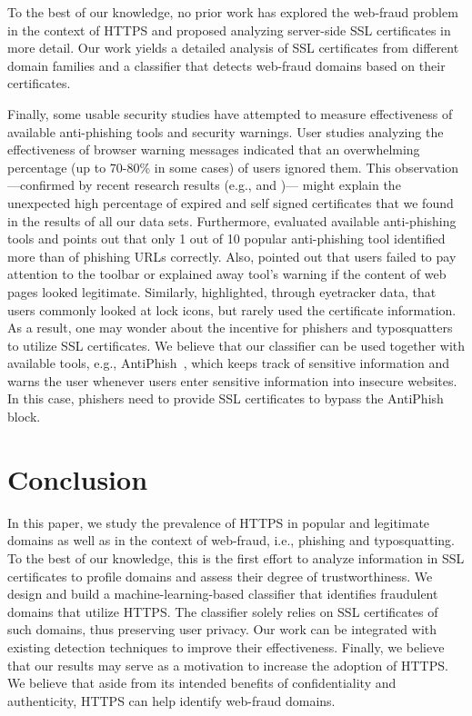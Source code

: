 \documentclass[twocolumn]{article}
\begin{document}
To the best of our knowledge, no prior work has explored the web-fraud problem 
in the context of HTTPS and proposed analyzing server-side SSL certificates in more detail.
Our work yields a detailed analysis of SSL certificates from different domain families and a 
classifier that detects web-fraud domains based on their certificates.

Finally, some usable security studies have attempted to measure effectiveness of available anti-phishing tools and security warnings.
User studies analyzing the effectiveness of browser warning messages indicated that an
overwhelming percentage (up to 70-80\% in some cases) of users ignored them. This
observation---confirmed by recent research results (e.g., \cite{ssl-usability}
and \cite{been-warned-ssl})--- might explain the unexpected high percentage of expired and
self signed certificates that we found in the results  of all our data sets.
Furthermore, \cite{zhang2007phinding} evaluated available anti-phishing tools and points out
that only 1 out of 10 popular anti-phishing tool identified more than  of phishing URLs correctly.
Also, \cite{wu2006security} pointed out that users failed to pay attention to the toolbar or explained away
tool's warning if the content of web pages looked legitimate.
Similarly, \cite{whalen2005gathering} highlighted, through eyetracker data, that users commonly
looked at lock icons, but rarely used the certificate information. As a result, one may wonder about the incentive for phishers and typosquatters
to utilize SSL certificates. We believe that our classifier can be used together with available tools, e.g., AntiPhish~\cite{protectphish},
which keeps track of sensitive information and warns the user whenever users enter sensitive information into insecure websites. 
In this case, phishers need to provide SSL certificates to bypass the AntiPhish block.

\section{Conclusion}\label{sec:conclusion}
In this paper, we study the prevalence of HTTPS in popular and 
legitimate domains as well as in the 
context of web-fraud, i.e., phishing and typosquatting.
To the best of our knowledge, this is the first effort to analyze 
information in SSL certificates to profile domains and 
assess their degree of trustworthiness. We design and build a machine-learning-based 
classifier that identifies fraudulent domains that utilize HTTPS. The classifier solely relies on 
SSL certificates of such domains, thus preserving user privacy.
Our work can be integrated with existing detection techniques to 
improve their effectiveness.
Finally, we believe that our results may serve as a motivation
to increase the adoption of HTTPS. We believe that 
aside from its intended benefits of confidentiality and authenticity, 
HTTPS can help identify web-fraud domains.
\end{document}
